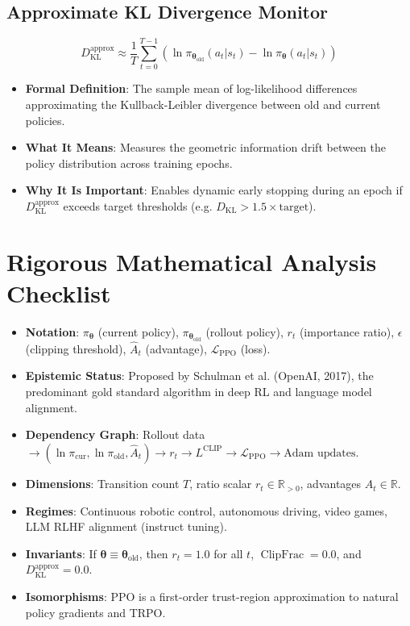 \documentclass[11pt,a4paper]{article}
\theoremstyle{definition}
\begin{document}
\subsection{Approximate KL Divergence Monitor}
{\boldmath
\begin{equation}
D_{\text{KL}}^{\text{approx}} \approx \frac{1}{T} \sum_{t=0}^{T-1} \left( \ln \pi_{\boldsymbol{\theta}_{\text{old}}}(a_t | s_t) - \ln \pi_{\boldsymbol{\theta}}(a_t | s_t) \right)
\end{equation}
}
\begin{itemize}
    \item \textbf{Formal Definition}: The sample mean of log-likelihood differences approximating the Kullback-Leibler divergence between old and current policies.
    \item \textbf{What It Means}: Measures the geometric information drift between the policy distribution across training epochs.
    \item \textbf{Why It Is Important}: Enables dynamic early stopping during an epoch if $D_{\text{KL}}^{\text{approx}}$ exceeds target thresholds (e.g. $D_{\text{KL}} > 1.5 \times \text{target}$).
\end{itemize}

\section{Rigorous Mathematical Analysis Checklist}

\begin{itemize}
    \item \textbf{Notation}: $\pi_{\boldsymbol{\theta}}$ (current policy), $\pi_{\boldsymbol{\theta}_{\text{old}}}$ (rollout policy), $r_t$ (importance ratio), $\epsilon$ (clipping threshold), $\widehat{A}_t$ (advantage), $\mathcal{L}_{\text{PPO}}$ (loss).
    \item \textbf{Epistemic Status}: Proposed by Schulman et al. (OpenAI, 2017), the predominant gold standard algorithm in deep RL and language model alignment.
    \item \textbf{Dependency Graph}: Rollout data $\to (\ln \pi_{\text{cur}}, \ln \pi_{\text{old}}, \widehat{A}_t) \to r_t \to L^{\text{CLIP}} \to \mathcal{L}_{\text{PPO}} \to \text{Adam updates}$.
    \item \textbf{Dimensions}: Transition count $T$, ratio scalar $r_t \in \mathbb{R}_{>0}$, advantages $\widehat{A}_t \in \mathbb{R}$.
    \item \textbf{Regimes}: Continuous robotic control, autonomous driving, video games, LLM RLHF alignment (instruct tuning).
    \item \textbf{Invariants}: If $\boldsymbol{\theta} \equiv \boldsymbol{\theta}_{\text{old}}$, then $r_t = 1.0$ for all $t$, $\operatorname{ClipFrac} = 0.0$, and $D_{\text{KL}}^{\text{approx}} = 0.0$.
    \item \textbf{Isomorphisms}: PPO is a first-order trust-region approximation to natural policy gradients and TRPO.
\end{itemize}
\end{document}
